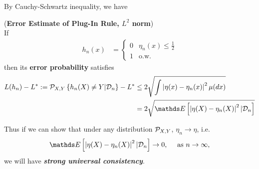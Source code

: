 \documentclass[11pt]{article}
\begin{document}
\begin{itemize}
By Cauchy-Schwartz inequality, we have
\begin{corollary}(\textbf{Error Estimate of Plug-In Rule, $L^2$ norm}) \citep{devroye2013probabilistic} \\
If \begin{align*}
h_n(x) &= \left\{ \begin{array}{cc}
0 & \eta_n(x) \le \frac{1}{2}\\
1 & \text{o.w.}
\end{array}
\right.
\end{align*} then its \textbf{error probability} satisfies
\begin{align}
L(h_n) - L^{*}:= \cP_{X,Y}\set{h_n(X) \neq Y | \cD_n} - L^{*} &\le 2 \sqrt{\int \abs{\eta(x) - \eta_n(x)}^2 \mu(dx)} \nonumber\\
&=2\sqrt{\E{}{\abs{\eta(X) - \eta_n(X)}^2 | \cD_n}} \label{eqn: plug_in_error_estimate_l1}
\end{align}
\end{corollary}

Thus if we can show that under any distribution ${\mathcal P}_{X,Y}$, $\eta_n \rightarrow \eta$, i.e.
\begin{align*}
\E{}{\abs{\eta(X) - \eta_n(X)}^2 | \cD_n} \rightarrow 0, \quad \text{ as }n\rightarrow \infty,
\end{align*} we will have \emph{\textbf{strong universal consistency}}.


\end{itemize}
\end{document}

